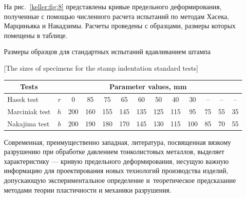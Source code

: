 На рис.~\ref{keller:fig:8} представлены кривые предельного деформирования, полученные с помощью численного расчета испытаний по методам Хасека, Марциньяка и Накадзимы. Расчеты проведены с образцами, размеры которых помещены в таблице. 





\begin{table}[t!]

\small \centering

 Размеры образцов для стандартных испытаний вдавливанием штампа 

 

 [The sizes of specimens for the stamp indentation standard tests] 

\vspace{1mm}

\renewcommand{\tabcolsep}{0.21cm}

\begin{tabular}{l|c|c|c|c|c|c|c|c|c|c|c|c}

\hline

\multicolumn{1}{c|}{\footnotesize Tests}&\multicolumn{12}{c}{\footnotesize Parameter values, mm}\\

\hline

\rule{0mm}{12pt}%

Hasek test & $r$ & 0 & 85 & 75 & 65 & 60 & 50 & 40 & 30 & -- & -- & --\\



Marciniak test & $h$ & 200 & 160 & 155 & 145 & 135 & 125 & 115 & 95 & 75 & 55 & 35\\



Nakajima test & $b$ & 200 & 190 & 180 & 170 & 145 & 130 & 115 & 100 & 85 & 70 & 55 \\      

\hline

\end{tabular}

\vspace{-3mm}

\end{table} 












Современная, преимущественно западная, литература, посвященная вязкому разрушению при обработке давлением тонколистовых металлов, выделяет  характеристику ---  кривую предельного деформирования, несущую важную информацию для проектирования новых технологий производства изделий, допускающую экспериментальное определение и~теоретическое предсказание методами теории пластичности и механики разрушения. 



